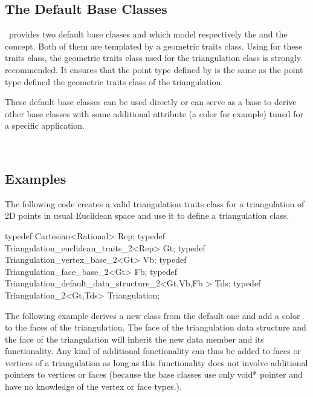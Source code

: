 \subsection{The Default Base Classes}
\cgal\ provides two default base classes 
 and 
which model respectively 
the  and the  concept.
Both of them are templated by a geometric traits class.
Using for these traits class, the geometric traits class used for the triangulation class
is strongly recommended. 
It ensures that the point type defined by 
is the same as the point type defined the  geometric traits class of
the triangulation.

These default base classes can be used directly or can serve as a base to derive
other base classes with some additional attribute (a color for example)
tuned for a specific application.

 \\

\subsection{Examples}
\ccExample
The following code creates a  valid triangulation traits class 
for a triangulation of 2D points in usual Euclidean space
and use it to define a triangulation class.

\begin{cprog}

typedef Cartesian<Rational> Rep;
typedef Triangulation_euclidean_traits_2<Rep> Gt;
typedef Triangulation_vertex_base_2<Gt> Vb;
typedef Triangulation_face_base_2<Gt> Fb;
typedef Triangulation_default_data_structure_2<Gt,Vb,Fb > Tds;
typedef Triangulation_2<Gt,Tds> Triangulation;

\end{cprog}

\ccExample
The following example derives a new  class from the default
one and add a color to the faces of the triangulation. 
The face of the triangulation data structure
and the face of the triangulation will inherit the new data member 
and its functionality.
Any kind of additional fonctionality can thus be added to faces or vertices of a triangulation 
as long as this functionality  does not involve additional pointers to vertices or faces
(because the base classes use only void* pointer and have no knowledge
of the vertex or face types.).

